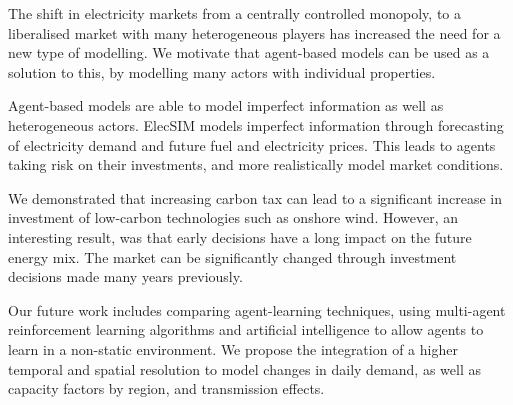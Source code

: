 
The shift in electricity markets from a centrally controlled monopoly, to a liberalised market with many heterogeneous players has increased the need for a new type of modelling. We motivate that agent-based models can be used as a solution to this, by modelling many actors with individual properties. 

Agent-based models are able to model imperfect information as well as heterogeneous actors. ElecSIM models imperfect information through forecasting of electricity demand and future fuel and electricity prices. This leads to agents taking risk on their investments, and more realistically model market conditions.

We demonstrated that increasing carbon tax can lead to a significant increase in investment of low-carbon technologies such as onshore wind. However, an interesting result, was that early decisions have a long impact on the future energy mix. The market can be significantly changed through investment decisions made many years previously. 

Our future work includes comparing agent-learning techniques, using multi-agent reinforcement learning algorithms and artificial intelligence to allow agents to learn in a non-static environment. We propose the integration of a higher temporal and spatial resolution to model changes in daily demand, as well as capacity factors by region, and transmission effects.


